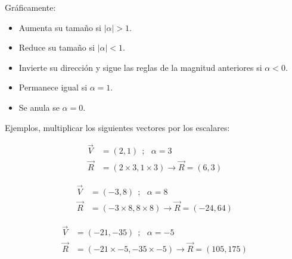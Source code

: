     Gráficamente:
    \begin{itemize}
        \item Aumenta su tamaño si $|\alpha| >1$.
        \item Reduce su tamaño si $|\alpha| <1$.

        \item Invierte su dirección y  sigue las reglas de la magnitud anteriores
            si $\alpha<0$.

        \item Permanece igual si $\alpha=1$.
        \item Se anula se $\alpha = 0$.
    \end{itemize}




    Ejemplos, multiplicar los siguientes vectores por los escalares:

    \begin{align*}
        \vec{V}& =(2,1)  \ \ ;\ \ \  \alpha =3 		\\
        \vec{R}&= (2\times3,1\times3 )   \rightarrow \vec{R}= (6,3 )
    \end{align*}

    \begin{align*}
        \vec{V}& =(-3,8)  \ \ ;\ \ \  \alpha = 8		\\
        \vec{R}&= (-3 \times8,8 \times8 )   \rightarrow \vec{R}= (-24,64 )
    \end{align*}

    \begin{align*}
        \vec{V}& =(-21,-35)  \ \ ;\ \ \ \alpha = -5		\\
        \vec{R}&= (-21 \times-5,-35 \times-5)  \rightarrow \vec{R} = (105,175 )
    \end{align*}






